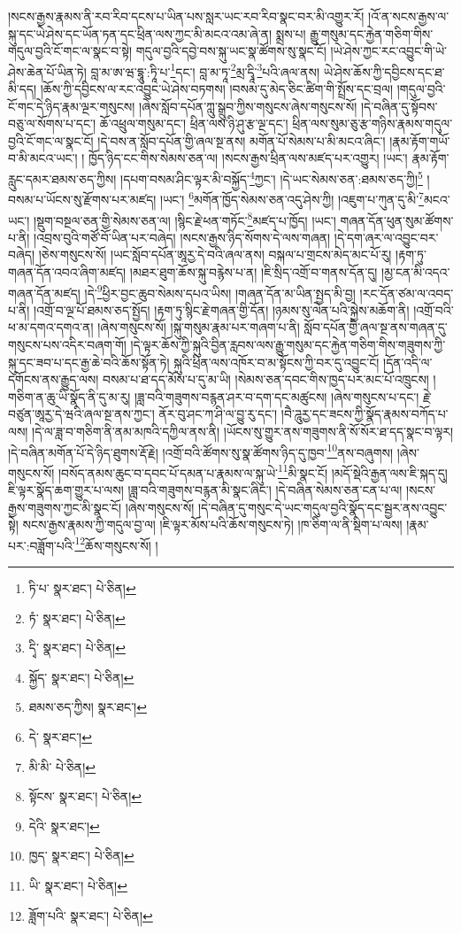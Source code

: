 །སངས་རྒྱས་རྣམས་ནི་རབ་རིབ་དངས་པ་ཡིན་པས་སླར་ཡང་རབ་རིབ་སྣང་བར་མི་འགྱུར་རོ། །འོ་ན་སངས་རྒྱས་ལ་སྐུ་དང་ཡེ་ཤེས་དང་ཡོན་ཏན་དང་ཕྲིན་ལས་ཀྱང་མི་མངའ་འམ་ཞེ་ན། སྨྲས་པ། རྒྱུ་གསུམ་དང་རྐྱེན་གཅིག་གིས་གདུལ་བྱའི་ངོ་གང་ལ་སྣང་བ་སྟེ། གདུལ་བྱའི་དབྱེ་བས་སྐུ་ཡང་སྣ་ཚོགས་སུ་སྣང་ངོ། །ཡེ་ཤེས་ཀྱང་རང་འབྱུང་གི་ཡེ་ཤེས་ཆེན་པོ་ཡིན་ཏེ། བླ་མ་ཨ་ཝ་དྷཱུ་:ཏཱི་པ་\footnote{ཏི་པ་  སྣར་ཐང་།  པེ་ཅིན། }དང་། བླ་མ་ཏཱ་\footnote{ཏཾ་  སྣར་ཐང་།  པེ་ཅིན། }མྲ་དྭཱི་\footnote{དྭི་  སྣར་ཐང་།  པེ་ཅིན། }པའི་ཞལ་ནས། ཡེ་ཤེས་ཆོས་ཀྱི་དབྱིངས་དང་ཐ་མི་དད། །ཆོས་ཀྱི་དབྱིངས་ལ་རང་འབྱུང་ཡེ་ཤེས་བཏགས། །བསམ་དུ་མེད་ཅིང་ཚིག་གི་སྤྲོས་དང་བྲལ། །གདུལ་བྱའི་ངོ་གང་དེ་ཉིད་རྣམ་ལྔར་གསུངས། །ཞེས་སློབ་དཔོན་ཀླུ་སྒྲུབ་ཀྱིས་གསུངས་ཞེས་གསུངས་སོ། །དེ་བཞིན་དུ་སྟོབས་བཅུ་ལ་སོགས་པ་དང་། ཆོ་འཕྲུལ་གསུམ་དང་། ཕྲིན་ལས་ཉི་ཤུ་རྩ་ལྔ་དང་། ཕྲིན་ལས་སུམ་ཅུ་རྩ་གཉིས་རྣམས་གདུལ་བྱའི་ངོ་གང་ལ་སྣང་ངོ། །དེ་བས་ན་སློབ་དཔོན་གྱི་ཞལ་སྔ་ནས། མགོན་པོ་སེམས་པ་མི་མངའ་ཞིང་། །རྣམ་རྟོག་གཡོ་བ་མི་མངའ་ཡང་། །
ཁྱོད་ཉིད་ངང་གིས་སེམས་ཅན་ལ། །སངས་རྒྱས་ཕྲིན་ལས་མཛད་པར་འགྱུར། །ཡང་། རྣམ་རྟོག་རླུང་དམར་ཐམས་ཅད་ཀྱིས། །དཔག་བསམ་ཤིང་ལྟར་མི་བསྐྱོད་\footnote{སྐྱོད་  སྣར་ཐང་།  པེ་ཅིན། }ཀྱང་། །དེ་ཡང་སེམས་ཅན་:ཐམས་ཅད་ཀྱི།\footnote{ཐམས་ཅད་ཀྱིས།  སྣར་ཐང་། } །བསམ་པ་ཡོངས་སུ་རྫོགས་པར་མཛད། །ཡང་། \footnote{དེ་  སྣར་ཐང་། }མགོན་ཁྱོད་སེམས་ཅན་འདུ་ཤེས་ཀྱི། །འཇུག་པ་ཀུན་དུ་མི་\footnote{མི་མི་  པེ་ཅིན། }མངའ་ཡང་། །སྡུག་བསྔལ་ཅན་གྱི་སེམས་ཅན་ལ། །སྙིང་རྗེ་ཕན་གཏོང་\footnote{སྟོངས་  སྣར་ཐང་།  པེ་ཅིན། }མཛད་པ་ཁྱོད། །ཡང་། གཞན་དོན་ཕུན་སུམ་ཚོགས་པ་ནི། །འབྲས་བུའི་གཙོ་བོ་ཡིན་པར་བཞེད། །སངས་རྒྱས་ཉིད་སོགས་དེ་ལས་གཞན། །དེ་དག་ཞར་ལ་འབྱུང་བར་བཞེད། །ཅེས་གསུངས་སོ། །ཡང་སློབ་དཔོན་ཨཱརྱ་དེ་བའི་ཞལ་ནས། བསྐལ་པ་གྲངས་མེད་མང་པོ་རུ། །རྟག་ཏུ་གཞན་དོན་འབའ་ཞིག་མཛད། །མཐར་ཐུག་ཆོས་སྐུ་བརྙེས་པ་ན། །ཇི་སྲིད་འགྲོ་བ་གནས་དོན་དུ། །མྱ་ངན་མི་འདའ་གཞན་དོན་མཛད། །དེ་\footnote{དེའི་  སྣར་ཐང་། }ཕྱིར་བྱང་ཆུབ་སེམས་དཔའ་ཡིས། །གཞན་དོན་མ་ཡིན་སྤྱད་མི་བྱ། །རང་དོན་ཙམ་ལ་འབད་པ་ནི། །འགྲོ་བ་ལྔ་པོ་ཐམས་ཅད་སྤྱོད། །རྟག་ཏུ་སྙིང་རྗེ་གཞན་གྱི་དོན། །ཉམས་སུ་ལེན་པའི་སྐྱེས་མཆོག་ནི། །འགྲོ་བའི་ཕ་མ་དགའ་དགའ་ན། །ཞེས་གསུངས་སོ། །སྐུ་གསུམ་རྣམ་པར་གཞག་པ་ནི། སློབ་དཔོན་གྱི་ཞལ་སྔ་ནས་གཞན་དུ་གསུངས་པས་འདིར་བཞག་གོ། །དེ་ལྟར་ཆོས་ཀྱི་སྐུའི་བྱིན་རླབས་ལས་རྒྱུ་གསུམ་དང་རྐྱེན་གཅིག་གིས་གཟུགས་ཀྱི་སྐུ་དང་ཟབ་པ་དང་རྒྱ་ཆེ་བའི་ཆོས་སྟོན་ཏེ། སྐུའི་ཕྲིན་ལས་འཁོར་བ་མ་སྟོངས་ཀྱི་བར་དུ་འབྱུང་ངོ། །དོན་འདི་ལ་དགོངས་ནས་རྒྱུད་ལས། བསམ་པ་ཐ་དད་མོས་པ་དུ་མ་ཡི། །སེམས་ཅན་དབང་གིས་ཁྱད་པར་མང་པོ་འཁྲུངས། །གཅིག་ན་ཆུ་ཡི་སྣོད་ནི་དུ་མ་རུ། །ཟླ་བའི་གཟུགས་བརྙན་ཤར་བ་དག་དང་མཚུངས། །ཞེས་གསུངས་པ་དང་། རྗེ་བཙུན་ཨཱརྱ་དེ་ཝའི་ཞལ་སྔ་ནས་ཀྱང་། ནོར་བུ་ཤང་ཀ་ཤི་ལ་བྱུ་རུ་དང་། །བཻ་ཌཱུརྱ་དང་ཟངས་ཀྱི་སྣོད་རྣམས་བཀོད་པ་ལས། །དེ་ལ་ཟླ་བ་གཅིག་ནི་ནམ་མཁའི་དཀྱིལ་ནས་ནི། །ཡོངས་སུ་གྱུར་ནས་གཟུགས་ནི་སོ་སོར་ཐ་དད་སྣང་བ་ལྟར། །དེ་བཞིན་མགོན་པོ་དེ་ཉིད་ཐུགས་རྡོ་རྗེ། །འགྲོ་བའི་ཚོགས་སུ་སྣ་ཚོགས་ཉིད་དུ་ཁྱབ་\footnote{ཁྱད་  སྣར་ཐང་།  པེ་ཅིན། }ནས་བཞུགས། །ཞེས་གསུངས་སོ། །བསོད་ནམས་ཆུང་བ་དབང་པོ་དམན་པ་རྣམས་ལ་སྐུ་ཡེ་\footnote{ཡི་  སྣར་ཐང་།  པེ་ཅིན། }མི་སྣང་ངོ། །མདོ་སྡེའི་རྒྱན་ལས་ཇི་སྐད་དུ། ཇི་ལྟར་སྣོད་ཆག་གྱུར་པ་ལས། །ཟླ་བའི་གཟུགས་བརྙན་མི་སྣང་ཞིང་། །དེ་བཞིན་སེམས་ཅན་ངན་པ་ལ། །སངས་རྒྱས་གཟུགས་ཀྱང་མི་སྣང་ངོ། །ཞེས་གསུངས་སོ། །དེ་བཞིན་དུ་གསུང་དེ་ཡང་གདུལ་བྱའི་སྣོད་དང་སྦྱར་ནས་འབྱུང་སྟེ། སངས་རྒྱས་རྣམས་ཀྱི་གདུལ་བྱ་ལ། །ཇི་ལྟར་མོས་པའི་ཆོས་གསུངས་ཏེ། །ཁ་ཅིག་ལ་ནི་སྡིག་པ་ལས། །རྣམ་པར་:བཟློག་པའི་\footnote{ཟློག་པའི་  སྣར་ཐང་།  པེ་ཅིན། }ཆོས་གསུངས་སོ། །
